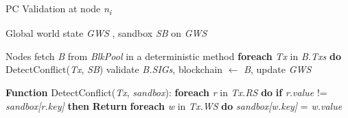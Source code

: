 \documentclass[journal]{IEEEtran}
\begin{document}
\begin{algorithm}
\caption{PC Validation at node \textit{n\textsubscript{i}}}
\begin{algorithmic}[1]

\Require \footnotesize Global world state \normalsize \textit{GWS} \footnotesize, sandbox \normalsize \textit{SB} \footnotesize on \textit{GWS} \normalsize

\State \small Nodes fetch \textit{B} from \textit{BlkPool} in a deterministic method \normalsize
\State \textbf{foreach} \textit{Tx} in \textit{B.Txs} \textbf{do} DetectConflict(\textit{Tx}, \textit{SB})
\State \small validate \textit{B.SIGs}, blockchain $\leftarrow{}$ \textit{B}, update \textit{GWS} \normalsize

\State \textbf{Function} DetectConflict(\textit{Tx}, \textit{sandbox}):
    \State \hspace{5mm} \textbf{foreach} \textit{r} in \textit{Tx.RS} \textbf{do}
        \State \hspace{10mm} \textbf{if} \textit{r.value} != \textit{sandbox[r.key]} \textbf{then} \textbf{Return}
    \State \hspace{5mm} \textbf{foreach} \textit{w} in \textit{Tx.WS} \textbf{do} \textit{sandbox[w.key]} = \textit{w.value}

\end{algorithmic}
\end{algorithm}
\end{document}
